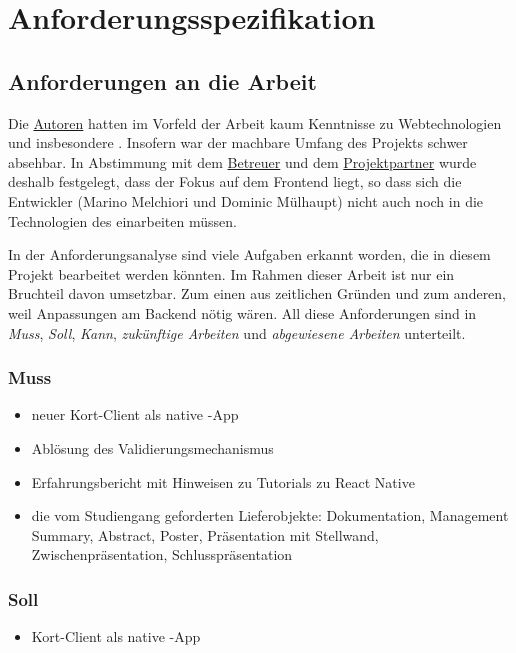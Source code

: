 \chapter{Anforderungsspezifikation}
\label{pd-anforderungsspezifikation}

\section{Anforderungen an die Arbeit} 
Die \hyperref[pm-team-autoren]{Autoren} hatten im Vorfeld der Arbeit kaum Kenntnisse zu Webtechnologien und insbesondere .
Insofern war der machbare Umfang des Projekts schwer absehbar.
In Abstimmung mit dem \hyperref[pm-team]{Betreuer} und dem \hyperref[pm-team]{Projektpartner} wurde deshalb festgelegt, dass der Fokus auf dem Frontend liegt, so dass sich die Entwickler (Marino Melchiori und Dominic Mülhaupt) nicht auch noch in die Technologien des  einarbeiten müssen.

In der Anforderungsanalyse sind viele Aufgaben erkannt worden, die in diesem Projekt bearbeitet werden könnten. 
Im Rahmen dieser Arbeit ist nur ein Bruchteil davon umsetzbar.
Zum einen aus zeitlichen Gründen und zum anderen, weil Anpassungen am Backend nötig wären.
All diese Anforderungen sind in \emph{Muss}, \emph{Soll}, \emph{Kann}, \emph{zukünftige Arbeiten} und \emph{abgewiesene Arbeiten} unterteilt.

\subsection{Muss}
\begin{itemize}
	\item neuer Kort-Client als native -App
	\item Ablösung des Validierungsmechanismus
	\item Erfahrungsbericht mit Hinweisen zu Tutorials zu React Native
	\item die vom Studiengang geforderten Lieferobjekte: Dokumentation, Management Summary, Abstract, Poster, Präsentation mit Stellwand, Zwischenpräsentation, Schlusspräsentation
\end{itemize}

\subsection{Soll}
\begin{itemize}
	\item Kort-Client als native -App
\end{itemize}

